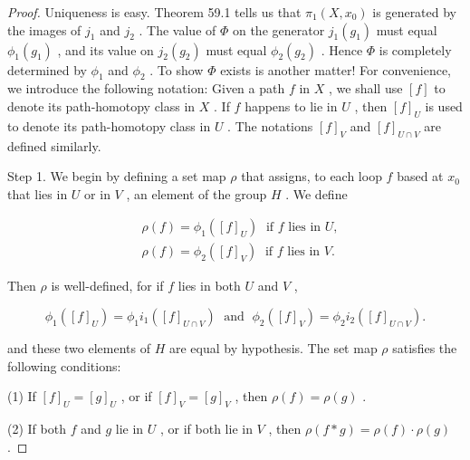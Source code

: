 \begin{proof}Uniqueness is easy. Theorem 59.1 tells us that \({\pi }_{1}\left( {X,{x}_{0}}\right)\) is generated by the images of \({j}_{1}\) and \({j}_{2}\) . The value of \(\Phi\) on the generator \({j}_{1}\left( {g}_{1}\right)\) must equal \({\phi }_{1}\left( {g}_{1}\right)\) , and its value on \({j}_{2}\left( {g}_{2}\right)\) must equal \({\phi }_{2}\left( {g}_{2}\right)\) . Hence \(\Phi\) is completely determined by \({\phi }_{1}\) and \({\phi }_{2}\) . To show \(\Phi\) exists is another matter!
For convenience, we introduce the following notation: Given a path \(f\) in \(X\) , we shall use \(\left\lbrack  f\right\rbrack\) to denote its path-homotopy class in \(X\) . If \(f\) happens to lie in \(U\) , then \({\left\lbrack  f\right\rbrack  }_{U}\) is used to denote its path-homotopy class in \(U\) . The notations \({\left\lbrack  f\right\rbrack  }_{V}\) and \({\left\lbrack  f\right\rbrack  }_{U \cap  V}\) are defined similarly.

Step 1. We begin by defining a set map \(\rho\) that assigns, to each loop \(f\) based at \({x}_{0}\) that lies in \(U\) or in \(V\) , an element of the group \(H\) . We define

\[
\begin{aligned}  & \rho \left( f\right)  = {\phi }_{1}\left( {\left\lbrack  f\right\rbrack  }_{U}\right) \;\text{ if }f\text{ lies in }U, \\  & \rho \left( f\right)  = {\phi }_{2}\left( {\left\lbrack  f\right\rbrack  }_{V}\right) \;\text{ if }f\text{ lies in }V. \end{aligned}
\]

Then \(\rho\) is well-defined, for if \(f\) lies in both \(U\) and \(V\) ,

\[
{\phi }_{1}\left( {\left\lbrack  f\right\rbrack  }_{U}\right)  = {\phi }_{1}{i}_{1}\left( {\left\lbrack  f\right\rbrack  }_{U \cap  V}\right) \;\text{ and }\;{\phi }_{2}\left( {\left\lbrack  f\right\rbrack  }_{V}\right)  = {\phi }_{2}{i}_{2}\left( {\left\lbrack  f\right\rbrack  }_{U \cap  V}\right) .
\]

and these two elements of \(H\) are equal by hypothesis. The set map \(\rho\) satisfies the following conditions:

(1) If \({\left\lbrack  f\right\rbrack  }_{U} = {\left\lbrack  g\right\rbrack  }_{U}\) , or if \({\left\lbrack  f\right\rbrack  }_{V} = {\left\lbrack  g\right\rbrack  }_{V}\) , then \(\rho \left( f\right)  = \rho \left( g\right)\) .

(2) If both \(f\) and \(g\) lie in \(U\) , or if both lie in \(V\) , then \(\rho \left( {f * g}\right)  = \rho \left( f\right)  \cdot  \rho \left( g\right)\) .


\end{proof}
